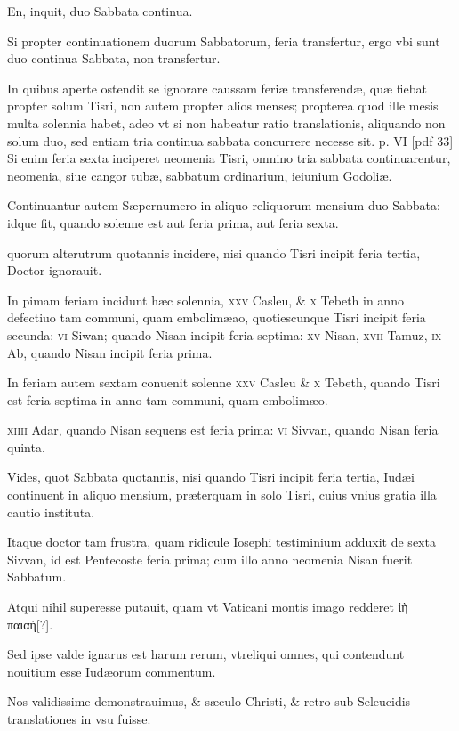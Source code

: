 \begin{parnumbers}
En, inquit, duo Sabbata continua.

Si propter continuationem duorum Sabbatorum, feria transfertur, ergo vbi sunt duo continua Sabbata, non transfertur. 

In quibus aperte ostendit se ignorare caussam feriæ transferendæ, quæ fiebat propter solum Tisri, non autem propter alios menses; propterea quod ille mesis multa solennia habet, adeo vt si non habeatur ratio translationis, aliquando non solum duo, sed entiam tria continua sabbata concurrere necesse sit.
\clearpage
p. VI [pdf 33]
Si enim feria sexta inciperet neomenia Tisri, omnino tria sabbata continuarentur, neomenia,
siue cangor tubæ, sabbatum ordinarium, ieiunium Godoliæ.

Continuantur autem Sæpernumero in aliquo reliquorum mensium duo Sabbata: idque fit, quando solenne est aut feria prima, aut feria sexta.

quorum alterutrum quotannis incidere, nisi quando Tisri incipit feria tertia, Doctor ignorauit.

In pimam feriam incidunt hæc solennia, \textsc{xxv} Casleu, \& \textsc{x} Tebeth in anno defectiuo tam communi, quam embolimæao, quotiescunque Tisri incipit feria secunda: \textsc{vi} Siwan; quando Nisan incipit feria septima: \textsc{xv} Nisan, \textsc{xvii} Tamuz, \textsc{ix} Ab, quando Nisan incipit feria prima.

In feriam autem sextam conuenit solenne \textsc{xxv} Casleu \& \textsc{x} Tebeth, quando Tisri est feria septima in anno tam communi, quam embolimæo.

\textsc{xiiii} Adar, quando Nisan sequens est feria prima: \textsc{vi} Sivvan, quando Nisan feria quinta.

Vides, quot Sabbata quotannis, nisi quando Tisri incipit feria tertia, Iudæi continuent in aliquo mensium, præterquam in solo Tisri, cuius vnius gratia illa cautio instituta.

Itaque doctor tam frustra, quam ridicule Iosephi testiminium adduxit de sexta Sivvan, id est Pentecoste feria prima; cum illo anno neomenia Nisan fuerit Sabbatum.

Atqui nihil superesse putauit, quam vt Vaticani montis imago redderet \textgreek{ἰὴ παιαή[?]}.

Sed ipse valde ignarus est harum rerum, vtreliqui omnes, qui contendunt nouitium esse Iudæorum commentum.

Nos validissime demonstrauimus, \& sæculo Christi, \& retro sub Seleucidis translationes in vsu fuisse.


\end{parnumbers}
